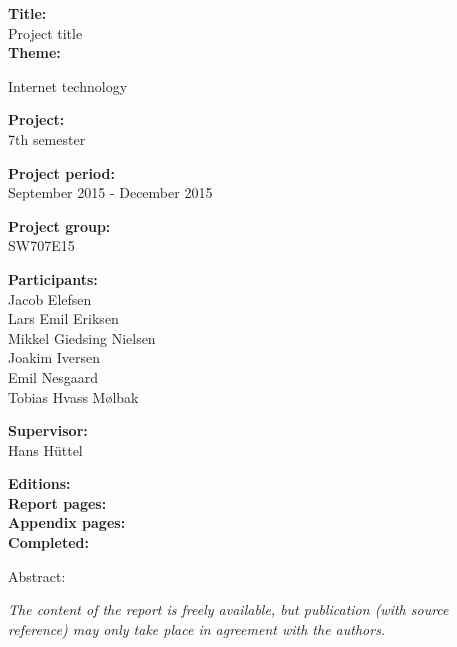 \begin{minipage}[t]{0.48\textwidth}
\textbf{Title:} \\[5pt]\bigskip\hspace{2ex}
Project title\\
\textbf{Theme:} \\[5pt]\bigskip\hspace{2ex}
\parbox{6.6 cm}{
Internet technology}

\textbf{Project:} \\[5pt]\bigskip\hspace{2ex}
7th semester

\textbf{Project period:} \\[5pt]\bigskip\hspace{2ex}
September 2015 - December 2015

\textbf{Project group:} \\[5pt]\bigskip\hspace{2ex}
SW707E15

\textbf{Participants:} \\[5pt]\hspace*{2ex}
Jacob Elefsen \\\hspace*{2ex}
Lars Emil Eriksen \\\hspace*{2ex}
Mikkel Giedsing Nielsen \\\hspace*{2ex}
Joakim Iversen \\\hspace*{2ex}
Emil Nesgaard \\\hspace*{2ex}
Tobias Hvass Mølbak \\\bigskip\hspace{2ex}

\textbf{Supervisor:} \\[5pt]\hspace*{2ex}
Hans Hüttel
\vspace*{1cm}

\textbf{Editions: } \\
\textbf{Report pages: \pageref{LastPage}} \\
\textbf{Appendix pages: } \\
\textbf{Completed: }

\end{minipage}
\hfill
\begin{minipage}[t]{0.48\textwidth}
Abstract: \\[5pt]
\fbox{\parbox{7cm}{\bigskip\bigskip}}
\end{minipage}

\vfill

{\footnotesize\itshape The content of the report is freely available, but publication (with source reference) may only take place in agreement with the authors.}

